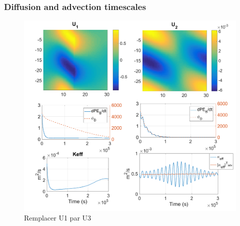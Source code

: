\subsubsection{Diffusion and advection timescales}
\begin{figure}[h!]
\centering
\includegraphics[width=1\textwidth]{./CHAP_BPE/Fig_numlab_advdiff2.png}
\caption{\color{red}Remplacer U1 par U3\color{black}}
\label{fig4numlab}
\end{figure}
